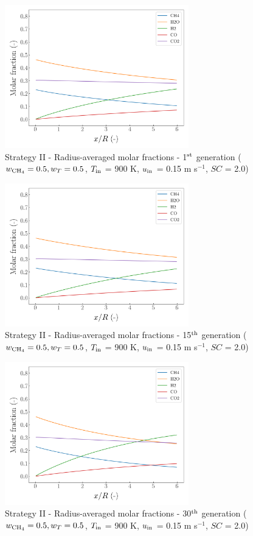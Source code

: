 \documentclass[preprint,12pt]{elsarticle}
\begin{document}
\begin{figure}[h!]
\centering
\includegraphics[width=80mm]{results/5Eq/50C_50T/GEN1-AVG.png}
\caption{\label{fig:5RES5050G1-avg} Strategy II - Radius-averaged molar fractions - 1$^{\rm{st}}$ generation ($w_{\rm{CH_4}} = 0.5, w_T = 0.5$, $T_{\rm{in}}$ = 900 K, $u_{\rm{in}}$ = 0.15 m s$^{-1}$, $SC$ = 2.0)}
\end{figure}

\begin{figure}[h!]
\centering
\includegraphics[width=80mm]{results/5Eq/50C_50T/GEN15-AVG.png}
\caption{\label{fig:5RES5050G15-avg} Strategy II - Radius-averaged molar fractions - 15$^{\rm{th}}$ generation ($w_{\rm{CH_4}} = 0.5, w_T = 0.5$, $T_{\rm{in}}$ = 900 K, $u_{\rm{in}}$ = 0.15 m s$^{-1}$, $SC$ = 2.0)}
\end{figure}

\begin{figure}[h!]
\centering
\includegraphics[width=80mm]{results/5Eq/50C_50T/GEN30-AVG.png}
\caption{\label{fig:5RES5050G30-avg} Strategy II - Radius-averaged molar fractions -  30$^{\rm{th}}$ generation ($w_{\rm{CH_4}} = 0.5, w_T = 0.5$, $T_{\rm{in}}$ = 900 K, $u_{\rm{in}}$ = 0.15 m s$^{-1}$, $SC$ = 2.0)}
\end{figure}
\end{document}
